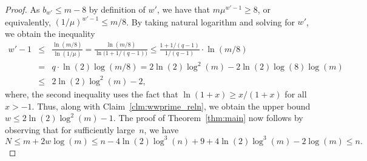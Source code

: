\documentclass[10pt,a4paper]{amsart}
\begin{document}
\begin{proof}
     As $b_{w'} \leq m - 8$ by definition of $w'$, we have that $m \mu^{w' -1} \geq 8$, or equivalently, $(1/\mu)^{w' - 1} \leq m/8$. By taking natural logarithm and solving for $w'$, we obtain the inequality 
     \begin{eqnarray*}
     w'-1 &\leq& \frac{\ln(m/8)}{\ln(1/\mu)} = \frac{\ln (m/8)}{\ln\bigl(1 + 1/(q-1)\bigr)} \leq \frac{1+1/(q-1)}{1/(q-1)}\cdot \ln( m/8)\\
     &=& q \cdot \ln(2) \log(m/8)= 2\ln(2)\log^2(m)-2\ln(2)\log(8)\log(m)\\[0.1em]
     &\leq& 2 \ln(2) \log^2 (m) - 2,    
     \end{eqnarray*}
    where, the second inequality uses the fact that $\ln(1+x) \geq x/(1+x)$ for all $x > -1$. Thus, along with Claim~\ref{clm:wwprime_reln}, we obtain the upper bound $w\leq 2\ln(2)\log^2(m)  -1 $.
    The proof of Theorem~\ref{thm:main} now follows by observing that for sufficiently large~$n$, we have $$N \leq m+2w\log(m) \leq  n-4\ln(2)\log^3(n) +9 + 4\ln(2)\log^3(m)-2\log(m) \leq n.$$\end{proof}
\end{document}
